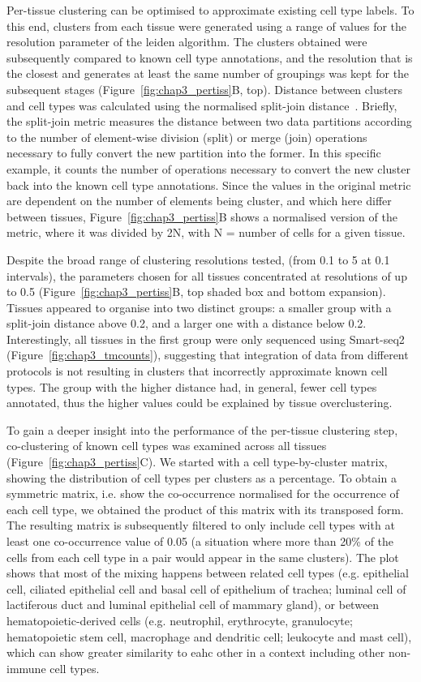 Per-tissue clustering can be optimised to approximate existing cell type labels. To this end, clusters from each tissue were generated using a range of values for the resolution parameter of the leiden algorithm. The clusters obtained were subsequently compared to known cell type annotations, and the resolution that is the closest and generates at least the same number of groupings was kept for the subsequent stages (Figure~\ref{fig:chap3_pertiss}B, top). Distance between clusters and cell types was calculated using the normalised split-join distance~\citep{dongen_performance_2000}. Briefly, the split-join metric measures the distance between two data partitions according to the number of element-wise division (split) or merge (join) operations necessary to fully convert the new partition into the former. In this specific example, it counts the number of operations necessary to convert the new cluster back into the known cell type annotations. Since the values in the original metric are dependent on the number of elements being cluster, and which here differ between tissues, Figure~\ref{fig:chap3_pertiss}B shows a normalised version of the metric, where it was divided by 2N, with N = number of cells for a given tissue.

Despite the broad range of clustering resolutions tested, (from 0.1 to 5 at 0.1 intervals), the parameters chosen for all tissues concentrated at resolutions of up to 0.5 (Figure~\ref{fig:chap3_pertiss}B, top shaded box and bottom expansion). Tissues appeared to organise into two distinct groups: a smaller group with a split-join distance above 0.2, and a larger one with a distance below 0.2. Interestingly, all tissues in the first group were only sequenced using Smart-seq2 (Figure~\ref{fig:chap3_tmcounts}), suggesting that integration of data from different protocols is not resulting in clusters that incorrectly approximate known cell types. The group with the higher distance had, in general, fewer cell types annotated, thus the higher values could be explained by tissue overclustering.

To gain a deeper insight into the performance of the per-tissue clustering step, co-clustering of known cell types was examined across all tissues (Figure~\ref{fig:chap3_pertiss}C). We started with a cell type-by-cluster matrix, showing the distribution of cell types per clusters as a percentage. To obtain a symmetric matrix, i.e. show the co-occurrence normalised for the occurrence of each cell type, we obtained the product of this matrix with its transposed form. The resulting matrix is subsequently filtered to only include cell types with at least one co-occurrence value of 0.05 (a situation where more than 20\% of the cells from each cell type in a pair would appear in the same clusters). The plot shows that most of the mixing happens between related cell types (e.g. epithelial cell, ciliated epithelial cell and basal cell of epithelium of trachea; luminal cell of lactiferous duct and luminal epithelial cell of mammary gland), or between hematopoietic-derived cells (e.g. neutrophil, erythrocyte, granulocyte; hematopoietic stem cell, macrophage and dendritic cell; leukocyte and mast cell), which can show greater similarity to eahc other in a context including other non-immune cell types.

